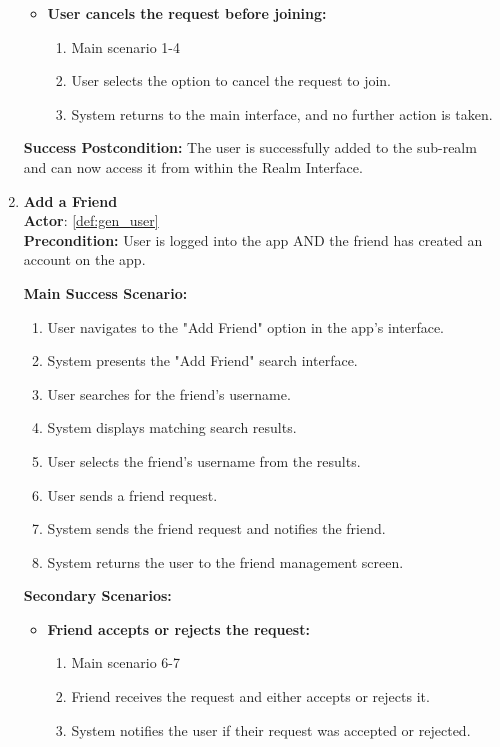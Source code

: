 \documentclass{article}
\begin{document}
\begin{enumerate}[label=\textbf{UC\arabic*}]
\begin{itemize}
            \item[{}] \textbf{User cancels the request before joining:}
            \begin{enumerate}[label=\textbf{\arabic*.}]
                \item Main scenario 1-4
                \item User selects the option to cancel the request to join.
                \item System returns to the main interface, and no further action is taken.
            \end{enumerate}
        \end{itemize}
        
        \textbf{Success Postcondition:} The user is successfully added to the sub-realm and can now access it from within the Realm Interface.

    \item \label{uc:20} \textbf{Add a Friend} \\
        \textbf{Actor}: \ref{def:gen_user} \\
        \textbf{Precondition:} User is logged into the app AND the friend has created an account on the app.
    
        \textbf{Main Success Scenario:}
        \begin{enumerate}[label=\textbf{\arabic*.}]
            \item User navigates to the "Add Friend" option in the app's interface.
            \item System presents the "Add Friend" search interface.
            \item User searches for the friend’s username.
            \item System displays matching search results.
            \item User selects the friend's username from the results.
            \item User sends a friend request.
            \item System sends the friend request and notifies the friend.
            \item System returns the user to the friend management screen.
        \end{enumerate}
        
        \textbf{Secondary Scenarios:}
        \begin{itemize}
            \item[{}] \textbf{Friend accepts or rejects the request:}
            \begin{enumerate}[label=\textbf{\arabic*.}]
                \item Main scenario 6-7
                \item Friend receives the request and either accepts or rejects it.
                \item System notifies the user if their request was accepted or rejected.
            \end{enumerate}
            

\end{itemize}
\end{enumerate}
\end{document}
